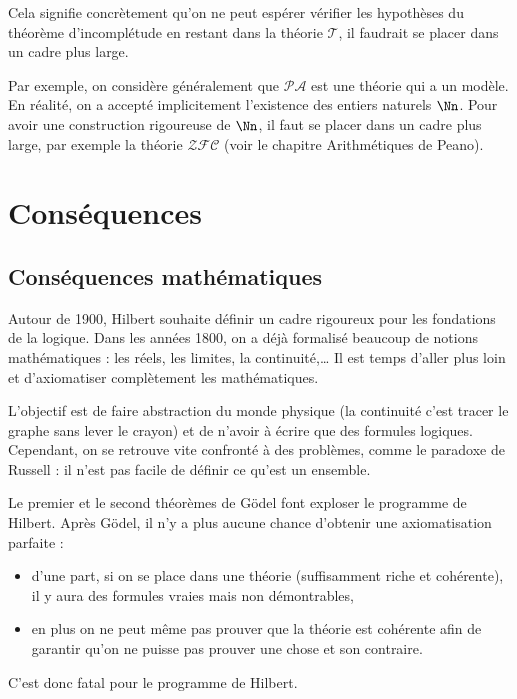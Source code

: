 \documentclass[11pt,class=report,crop=false]{standalone}
\begin{document}
Cela signifie concrètement qu'on ne peut espérer vérifier les hypothèses du théorème d'incomplétude en restant dans la théorie $\mathcal{T}$, il faudrait se placer dans un cadre plus large.

Par exemple, on considère généralement que $\mathcal{PA}$ est une théorie qui a un modèle. En réalité, on a accepté implicitement l'existence des entiers naturels $\Nn$. Pour avoir une construction rigoureuse de $\Nn$, il faut se placer dans un cadre plus large, par exemple la théorie $\mathcal{ZFC}$ (voir le chapitre \og{}Arithmétiques de Peano\fg{}).



\section{Conséquences}

\subsection{Conséquences mathématiques}

Autour de 1900, Hilbert souhaite définir un cadre rigoureux pour les fondations de la logique. Dans les années 1800, on a déjà formalisé beaucoup de notions mathématiques : les réels, les limites, la continuité,\ldots{} Il est temps d'aller plus loin et d'axiomatiser complètement les mathématiques.

L'objectif est de faire abstraction du monde physique (la continuité c'est tracer le graphe sans lever le crayon) et de n'avoir à écrire que des formules logiques. Cependant, on se retrouve vite confronté à des problèmes, comme le paradoxe de Russell : il n'est pas facile de définir ce qu'est un ensemble.

Le premier et le second théorèmes de Gödel font exploser le programme de Hilbert. Après Gödel, il n'y a plus aucune chance d'obtenir une axiomatisation parfaite : 
\begin{itemize}
    \item d'une part, si on se place dans une théorie (suffisamment riche et cohérente), il y aura des formules vraies mais non démontrables, 

    \item en plus on ne peut même pas prouver que la théorie est cohérente afin de garantir qu'on ne puisse pas prouver une chose et son contraire.
\end{itemize}
C'est donc fatal pour le programme de Hilbert.
\end{document}
